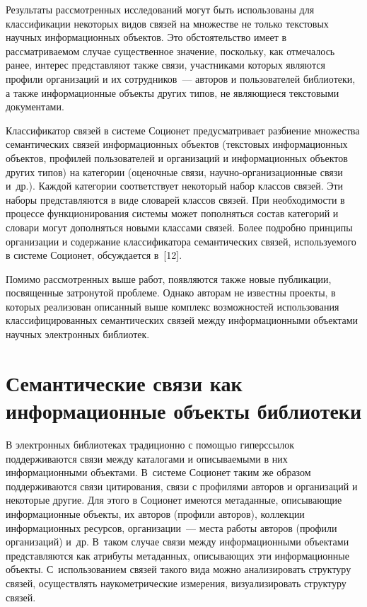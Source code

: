 \begin{multicols}{2}
  Результаты рассмотренных исследований могут быть использованы для 
классификации некоторых видов связей на множестве не только текстовых 
научных информационных объектов. Это обстоятельство имеет в 
рассматриваемом случае существенное значение, поскольку, как отмечалось 
ранее, интерес представляют также связи, участниками которых являются 
профили организаций и их сотрудников~--- авторов и пользователей 
библиотеки, а также информационные объекты других типов, не являющиеся 
текстовыми документами. 
  
  Классификатор связей в системе Соционет предусмат\-ри\-ва\-ет разбиение 
множества семантических связей информационных объектов (текстовых 
информационных объектов, профилей пользователей и организаций и 
информационных объектов других типов) на категории (оценочные связи,
   на\-уч\-но-ор\-га\-ни\-за\-ци\-он\-ные связи и~др.). Каждой категории 
соответствует некоторый набор классов связей. Эти наборы представляются в 
виде словарей классов связей. При необходимости в процессе 
функционирования сис\-те\-мы может пополняться состав категорий и словари 
могут дополняться новыми классами связей. Более подробно принципы 
организации и содержание классификатора семантических связей, 
используемого в системе Соционет, обсуждается в~[12].
  
  Помимо рассмотренных выше работ, появляются также новые публикации, 
посвященные затронутой проблеме. Однако авторам не известны проекты, в 
которых реализован описанный выше комплекс возможностей использования 
классифицированных семантических связей между информационными 
объектами научных электронных биб\-лиотек.

\vspace*{-12pt}

\section{Семантические связи как информационные объекты 
библиотеки}

  В электронных библиотеках традиционно с помощью гиперссылок 
поддерживаются связи между каталогами и описываемыми в них 
информационными объектами. В~сис\-те\-ме Соционет таким же образом 
поддерживаются связи цитирования, связи с профилями авторов и организаций 
и некоторые другие. Для этого в Соционет имеются метаданные, 
описывающие информационные объекты, их авторов (профили авторов), 
коллекции информационных ресурсов, организации~--- мес\-та работы авторов 
(профили организаций) и~др. В~таком случае связи между информационными 
объектами представляются как атрибуты метаданных, описывающих эти 
информационные объекты. С~использованием связей такого вида можно 
анализировать структуру связей, осуществлять нау\-ко\-мет\-ри\-че\-ские измерения, 
визуализировать структуру связей. 
{

}
\end{multicols}
